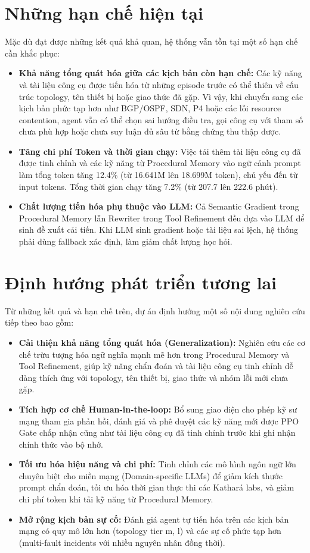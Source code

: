 \section{Những hạn chế hiện tại}
\label{sec:limitations}

Mặc dù đạt được những kết quả khả quan, hệ thống vẫn tồn tại một số hạn chế cần khắc phục:
\begin{itemize}
    \item \textbf{Khả năng tổng quát hóa giữa các kịch bản còn hạn chế:} Các kỹ năng và tài liệu công cụ được tiến hóa từ những episode trước có thể thiên về cấu trúc topology, tên thiết bị hoặc giao thức đã gặp. Vì vậy, khi chuyển sang các kịch bản phức tạp hơn như BGP/OSPF, SDN, P4 hoặc các lỗi resource contention, agent vẫn có thể chọn sai hướng điều tra, gọi công cụ với tham số chưa phù hợp hoặc chưa suy luận đủ sâu từ bằng chứng thu thập được.
    \item \textbf{Tăng chi phí Token và thời gian chạy:} Việc tải thêm tài liệu công cụ đã được tinh chỉnh và các kỹ năng từ Procedural Memory vào ngữ cảnh prompt làm tổng token tăng 12.4\% (từ 16.641M lên 18.699M token), chủ yếu đến từ input tokens. Tổng thời gian chạy tăng 7.2\% (từ 207.7 lên 222.6 phút).
    \item \textbf{Chất lượng tiến hóa phụ thuộc vào LLM:} Cả Semantic Gradient trong Procedural Memory lẫn Rewriter trong Tool Refinement đều dựa vào LLM để sinh đề xuất cải tiến. Khi LLM sinh gradient hoặc tài liệu sai lệch, hệ thống phải dùng fallback xác định, làm giảm chất lượng học hỏi.
\end{itemize}

\section{Định hướng phát triển tương lai}
\label{sec:future_work}

Từ những kết quả và hạn chế trên, dự án định hướng một số nội dung nghiên cứu tiếp theo bao gồm:
\begin{itemize}
    \item \textbf{Cải thiện khả năng tổng quát hóa (Generalization):} Nghiên cứu các cơ chế trừu tượng hóa ngữ nghĩa mạnh mẽ hơn trong Procedural Memory và Tool Refinement, giúp kỹ năng chẩn đoán và tài liệu công cụ tinh chỉnh dễ dàng thích ứng với topology, tên thiết bị, giao thức và nhóm lỗi mới chưa gặp.
    \item \textbf{Tích hợp cơ chế Human-in-the-loop:} Bổ sung giao diện cho phép kỹ sư mạng tham gia phản hồi, đánh giá và phê duyệt các kỹ năng mới được PPO Gate chấp nhận cũng như tài liệu công cụ đã tinh chỉnh trước khi ghi nhận chính thức vào bộ nhớ.
    \item \textbf{Tối ưu hóa hiệu năng và chi phí:} Tinh chỉnh các mô hình ngôn ngữ lớn chuyên biệt cho miền mạng (Domain-specific LLMs) để giảm kích thước prompt chẩn đoán, tối ưu hóa thời gian thực thi các Kathará labs, và giảm chi phí token khi tải kỹ năng từ Procedural Memory.
    \item \textbf{Mở rộng kịch bản sự cố:} Đánh giá agent tự tiến hóa trên các kịch bản mạng có quy mô lớn hơn (topology tier m, l) và các sự cố phức tạp hơn (multi-fault incidents với nhiều nguyên nhân đồng thời).
\end{itemize}
